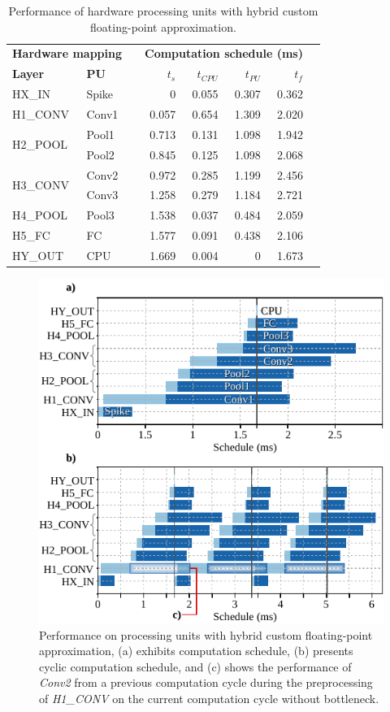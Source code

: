\begin{table}[t!]\centering
	\caption{Performance of hardware processing units with hybrid custom floating-point approximation.}\label{tab:latency_cfp}
	\scriptsize
	\begin{tabular}{llrrrrrr}\toprule
		\multicolumn{2}{c}{\textbf{Hardware mapping}} & &\multicolumn{4}{c}{\textbf{Computation schedule (ms)}} \\\cmidrule{1-2}\cmidrule{4-7}
		\textbf{Layer} &\textbf{PU} & &$t_s$ &$t_{CPU}$ &$t_{PU}$ &$t_f$ \\\midrule
		HX\_IN &Spike & &0 &0.055 &0.307 &0.362 \\
		H1\_CONV &Conv1 & &0.057 &0.654 &1.309 &2.020 \\
		\multirow{2}{*}{H2\_POOL} &Pool1 & &0.713 &0.131 &1.098 &1.942 \\
		&Pool2 & &0.845 &0.125 &1.098 &2.068 \\
		\multirow{2}{*}{H3\_CONV} &Conv2 & &0.972 &0.285 &1.199 &2.456 \\
		&Conv3 & &1.258 &0.279 &1.184 &2.721 \\
		H4\_POOL &Pool3 & &1.538 &0.037 &0.484 &2.059 \\
		H5\_FC &FC & &1.577 &0.091 &0.438 &2.106 \\
		HY\_OUT &CPU & &1.669 &0.004 &0 &1.673 \\
		\bottomrule
	\end{tabular}
\end{table}

\begin{figure}[b!]
	\centering
	\includegraphics[width=0.5\columnwidth]{./chapters/sbs_accelerator/figures/latency_cfp_cycle.pdf}
	\caption{Performance on processing units with hybrid custom floating-point approximation, (a) exhibits computation schedule, (b) presents cyclic computation schedule, and (c) shows the performance of \emph{Conv2} from a previous computation cycle during the preprocessing of \emph{H1\_CONV} on the current computation cycle without bottleneck.}
	\label{fig:latency_pu_cfp_cycle}
\end{figure}


